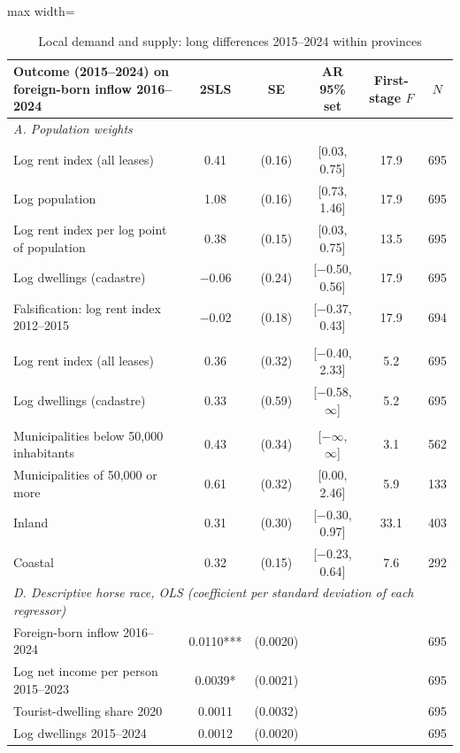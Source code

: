 \begin{table}[!htbp]\centering\small
\caption{Local demand and supply: long differences 2015--2024 within provinces}\label{tab:local}
\begin{adjustbox}{max width=\linewidth}\begin{tabular}{lccccc}\toprule
Outcome (2015--2024) on foreign-born inflow 2016--2024 & 2SLS & SE & AR 95\% set & First-stage $F$ & $N$\\\midrule
\multicolumn{6}{l}{\textit{A. Population weights}}\\
Log rent index (all leases) & 0.41 & (0.16) & [0.03, 0.75] & 17.9 & 695\\
Log population & 1.08 & (0.16) & [0.73, 1.46] & 17.9 & 695\\
Log rent index per log point of population & 0.38 & (0.15) & [0.03, 0.75] & 13.5 & 695\\
Log dwellings (cadastre) & $-$0.06 & (0.24) & [$-$0.50, 0.56] & 17.9 & 695\\
Falsification: log rent index 2012--2015 & $-$0.02 & (0.18) & [$-$0.37, 0.43] & 17.9 & 694\\
\addlinespace
\multicolumn{6}{l}{\textit{B. Unweighted}}\\
Log rent index (all leases) & 0.36 & (0.32) & [$-$0.40, 2.33] & 5.2 & 695\\
Log dwellings (cadastre) & 0.33 & (0.59) & [$-$0.58, $\infty$] & 5.2 & 695\\
\addlinespace
\multicolumn{6}{l}{\textit{C. Log rent index by size and location (population weights)}}\\
Municipalities below 50,000 inhabitants & 0.43 & (0.34) & [$-\infty$, $\infty$] & 3.1 & 562\\
Municipalities of 50,000 or more & 0.61 & (0.32) & [0.00, 2.46] & 5.9 & 133\\
Inland & 0.31 & (0.30) & [$-$0.30, 0.97] & 33.1 & 403\\
Coastal & 0.32 & (0.15) & [$-$0.23, 0.64] & 7.6 & 292\\
\midrule
\multicolumn{6}{l}{\textit{D. Descriptive horse race, OLS (coefficient per standard deviation of each regressor)}}\\
Foreign-born inflow 2016--2024 & 0.0110*** & (0.0020) & & & 695\\
Log net income per person 2015--2023 & 0.0039* & (0.0021) & & & 695\\
Tourist-dwelling share 2020 & 0.0011 & (0.0032) & & & 695\\
Log dwellings 2015--2024 & 0.0012 & (0.0020) & & & 695\\

\end{tabular}
\end{adjustbox}
\end{table}
